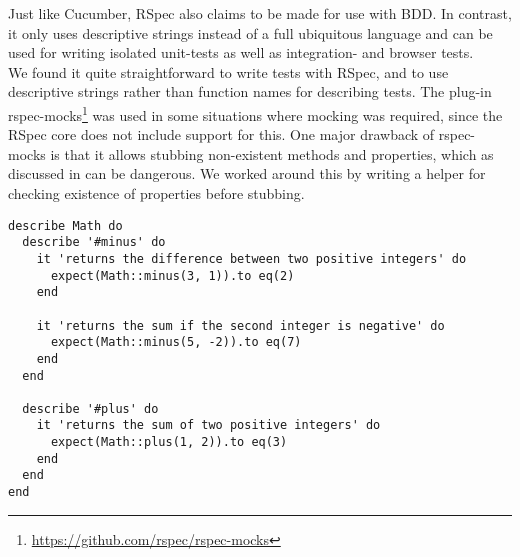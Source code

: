 
Just like Cucumber, RSpec also claims to be made for use with BDD. In
contrast, it only uses descriptive strings instead of a full ubiquitous
language and can be used for writing isolated unit-tests as well as
integration- and browser tests.\\

We found it quite straightforward to write tests with RSpec, and to use
descriptive strings rather than function names for describing tests. The
plug-in rspec-mocks\footnote{\url{https://github.com/rspec/rspec-mocks}}
was used in some situations where mocking was required, since the RSpec
core does not include support for this. One major drawback of rspec-
mocks is that it allows stubbing non-existent methods and properties,
which as discussed in  can be dangerous. We
worked around this by writing a helper for checking existence of
properties before stubbing.\\

\begin{lstlisting}[caption=Example of RSpec tests for a module.,
                   label=lst:rspec, float=t]
describe Math do
  describe '#minus' do
    it 'returns the difference between two positive integers' do
      expect(Math::minus(3, 1)).to eq(2)
    end

    it 'returns the sum if the second integer is negative' do
      expect(Math::minus(5, -2)).to eq(7)
    end
  end

  describe '#plus' do
    it 'returns the sum of two positive integers' do
      expect(Math::plus(1, 2)).to eq(3)
    end
  end
end
\end{lstlisting}
